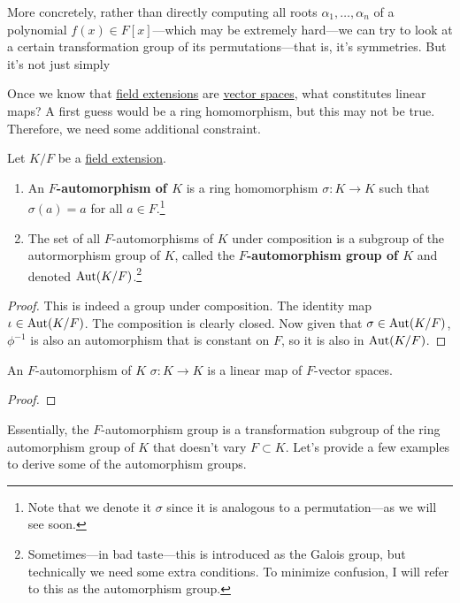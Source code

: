   More concretely, rather than directly computing all roots $\alpha_1, \ldots, \alpha_n$ of a polynomial $f(x) \in F[x]$---which may be extremely hard---we can try to look at a certain transformation group of its permutations---that is, it's symmetries. But it's not just simply 

  Once we know that \hyperref[def:field-extension]{field extensions} are \hyperref[def:vector-space]{vector spaces}, what constitutes linear maps? A first guess would be a ring homomorphism, but this may not be true. Therefore, we need some additional constraint. 

  \begin{definition}
    \label{def:field-automorphisms}
    Let $K/F$ be a \hyperref[def:field-extension]{field extension}. 
    \begin{enumerate}
      \item An \textbf{$F$-automorphism of $K$} is a ring homomorphism $\sigma: K \to K$ such that $\sigma(a) = a$ for all $a \in F$.\footnote{Note that we denote it $\sigma$ since it is analogous to a permutation---as we will see soon.}
      \item The set of all $F$-automorphisms of $K$ under composition is a subgroup of the autormorphism group of $K$, called the \textbf{$F$-automorphism group of $K$} and denoted $\operatorname{Aut}(K/F)$.\footnote{Sometimes---in bad taste---this is introduced as the Galois group, but technically we need some extra conditions. To minimize confusion, I will refer to this as the automorphism group.}
    \end{enumerate}
  \end{definition}
  \begin{proof}
    This is indeed a group under composition. The identity map $\iota \in \operatorname{Aut}(K/F)$. The composition is clearly closed. Now given that $\sigma \in \operatorname{Aut}(K/F)$, $\phi^{-1}$ is also an automorphism that is constant on $F$, so it is also in $\operatorname{Aut}(K/F)$. 
  \end{proof}

  \begin{lemma}
    \label{thm:linear-map}
    An $F$-automorphism of $K$ $\sigma: K \to K$ is a linear map of $F$-vector spaces. 
  \end{lemma}
  \begin{proof}
    
  \end{proof}

  Essentially, the $F$-automorphism group is a transformation subgroup of the ring automorphism group of $K$ that doesn't vary $F \subset K$. Let's provide a few examples to derive some of the automorphism groups. 

